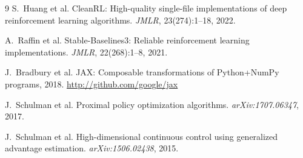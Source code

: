 \documentclass[11pt,twocolumn]{article}
\begin{document}
\begin{thebibliography}{9}
S.~Huang et al.
\newblock CleanRL: High-quality single-file implementations of deep
  reinforcement learning algorithms.
\newblock \textit{JMLR}, 23(274):1--18, 2022.

A.~Raffin et al.
\newblock Stable-Baselines3: Reliable reinforcement learning implementations.
\newblock \textit{JMLR}, 22(268):1--8, 2021.

J.~Bradbury et al.
\newblock JAX: Composable transformations of Python+NumPy programs, 2018.
\newblock \url{http://github.com/google/jax}

J.~Schulman et al.
\newblock Proximal policy optimization algorithms.
\newblock \textit{arXiv:1707.06347}, 2017.

J.~Schulman et al.
\newblock High-dimensional continuous control using generalized advantage
  estimation.
\newblock \textit{arXiv:1506.02438}, 2015.
\end{thebibliography}
\end{document}

